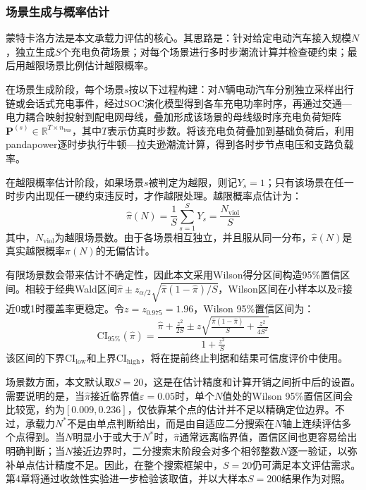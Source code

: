 \documentclass[10pt,a4paper]{article}
\numberwithin{equation}{section}
\numberwithin{table}{section}
\numberwithin{figure}{section}
\begin{document}
    \subsubsection{场景生成与概率估计}

    蒙特卡洛方法是本文承载力评估的核心。其思路是：针对给定电动汽车接入规模$N$，独立生成$S$个充电负荷场景；对每个场景进行多时步潮流计算并检查硬约束；最后用越限场景比例估计越限概率。

    在场景生成阶段，每个场景$s$按以下过程构建：对$N$辆电动汽车分别独立采样出行链或会话式充电事件，经过SOC演化模型得到各车充电功率时序，再通过交通—电力耦合映射投射到配电网母线，叠加形成该场景的母线级时序充电负荷矩阵$\mathbf{P}^{(s)} \in \mathbb{R}^{T \times n_{\text{bus}}}$，其中$T$表示仿真时步数。将该充电负荷叠加到基础负荷后，利用pandapower逐时步执行牛顿—拉夫逊潮流计算，得到各时步节点电压和支路负载率。

    在越限概率估计阶段，如果场景$s$被判定为越限，则记$Y_s = 1$；只有该场景在任一时步内出现任一硬约束违反时，才作越限处理。越限概率点估计为：
    \begin{equation}
    \label{eq:violation_probability_estimator}
    \hat{\pi}(N) = \frac{1}{S} \sum_{s=1}^{S} Y_s = \frac{N_{\text{viol}}}{S}
    \end{equation}
    其中，$N_{\text{viol}}$为越限场景数。由于各场景相互独立，并且服从同一分布，$\hat{\pi}(N)$是真实越限概率$\pi(N)$的无偏估计。

    有限场景数会带来估计不确定性，因此本文采用Wilson得分区间构造95\%置信区间。相较于经典Wald区间$\hat{\pi} \pm z_{\alpha/2}\sqrt{\hat{\pi}(1-\hat{\pi})/S}$，Wilson区间在小样本以及$\hat{\pi}$接近0或1时覆盖率更稳定。令$z = z_{0.975} = 1.96$，Wilson 95\%置信区间为：
    \begin{equation}
    \label{eq:wilson_interval}
    \text{CI}_{95\%}(\hat{\pi}) = \frac{\hat{\pi} + \frac{z^2}{2S} \pm z\sqrt{\frac{\hat{\pi}(1-\hat{\pi})}{S} + \frac{z^2}{4S^2}}}{1 + \frac{z^2}{S}}
    \end{equation}
    该区间的下界$\text{CI}_{\text{low}}$和上界$\text{CI}_{\text{high}}$，将在提前终止判据和结果可信度评价中使用。

    场景数方面，本文默认取$S = 20$，这是在估计精度和计算开销之间折中后的设置。需要说明的是，当$\hat{\pi}$接近临界值$\varepsilon = 0.05$时，单个$N$值处的Wilson 95\%置信区间会比较宽，约为$[0.009, 0.236]$，仅依靠某个点的估计并不足以精确定位边界。不过，承载力$N^*$不是由单点判断给出，而是由自适应二分搜索在$N$轴上连续评估多个点得到。当$N$明显小于或大于$N^*$时，$\hat{\pi}$通常远离临界值，置信区间也更容易给出明确判断；当$N$接近边界时，二分搜索末阶段会对多个相邻整数$N$逐一验证，以弥补单点估计精度不足。因此，在整个搜索框架中，$S = 20$仍可满足本文评估需求。第4章将通过收敛性实验进一步检验该取值，并以大样本$S = 200$结果作为对照。
\end{document}
